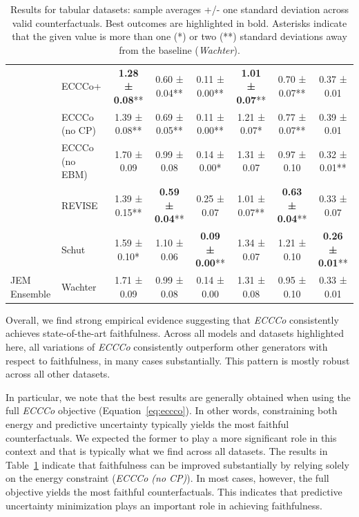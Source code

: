 \documentclass[letterpaper]{article} %
\begin{document}
\begin{table}
{\begin{tabular}[t]{llcccccc}
    & ECCCo+ & \textbf{1.28 ± 0.08}** & 0.60 ± 0.04** & 0.11 ± 0.00** & \textbf{1.01 ± 0.07}** & 0.70 ± 0.07** & 0.37 ± 0.01\hphantom{*}\hphantom{*}\\

    & ECCCo (no CP) & 1.39 ± 0.08** & 0.69 ± 0.05** & 0.11 ± 0.00** & 1.21 ± 0.07*\hphantom{*} & 0.77 ± 0.07** & 0.39 ± 0.01\hphantom{*}\hphantom{*}\\

    & ECCCo (no EBM) & 1.70 ± 0.09\hphantom{*}\hphantom{*} & 0.99 ± 0.08\hphantom{*}\hphantom{*} & 0.14 ± 0.00*\hphantom{*} & 1.31 ± 0.07\hphantom{*}\hphantom{*} & 0.97 ± 0.10\hphantom{*}\hphantom{*} & 0.32 ± 0.01**\\

    & REVISE & 1.39 ± 0.15** & \textbf{0.59 ± 0.04}** & 0.25 ± 0.07\hphantom{*}\hphantom{*} & 1.01 ± 0.07** & \textbf{0.63 ± 0.04}** & 0.33 ± 0.07\hphantom{*}\hphantom{*}\\

    & Schut & 1.59 ± 0.10*\hphantom{*} & 1.10 ± 0.06\hphantom{*}\hphantom{*} & \textbf{0.09 ± 0.00}** & 1.34 ± 0.07\hphantom{*}\hphantom{*} & 1.21 ± 0.10\hphantom{*}\hphantom{*} & \textbf{0.26 ± 0.01}**\\

\multirow{-7}{*}{\raggedright\arraybackslash JEM Ensemble} & Wachter & 1.71 ± 0.09\hphantom{*}\hphantom{*} & 0.99 ± 0.08\hphantom{*}\hphantom{*} & 0.14 ± 0.00\hphantom{*}\hphantom{*} & 1.31 ± 0.08\hphantom{*}\hphantom{*} & 0.95 ± 0.10\hphantom{*}\hphantom{*} & 0.33 ± 0.01\hphantom{*}\hphantom{*}\\
\bottomrule
\end{tabular}}
\caption{Results for tabular datasets: sample averages +/- one standard deviation across valid counterfactuals. Best outcomes are highlighted in bold. Asterisks indicate that the given value is more than one (*) or two (**) standard deviations away from the baseline (\textit{Wachter}). \label{tab:results-tabular}}
\end{table}
    

Overall, we find strong empirical evidence suggesting that \textit{ECCCo} consistently achieves state-of-the-art faithfulness. Across all models and datasets highlighted here, all variations of \textit{ECCCo} consistently outperform other generators with respect to faithfulness, in many cases substantially. This pattern is mostly robust across all other datasets. 

In particular, we note that the best results are generally obtained when using the full \textit{ECCCo} objective (Equation~\ref{eq:eccco}). In other words, constraining both energy and predictive uncertainty typically yields the most faithful counterfactuals. We expected the former to play a more significant role in this context and that is typically what we find across all datasets. The results in Table~\ref{tab:results-tabular} indicate that faithfulness can be improved substantially by relying solely on the energy constraint (\textit{ECCCo (no CP)}). In most cases, however, the full objective yields the most faithful counterfactuals. This indicates that predictive uncertainty minimization plays an important role in achieving faithfulness. 
\end{document}
